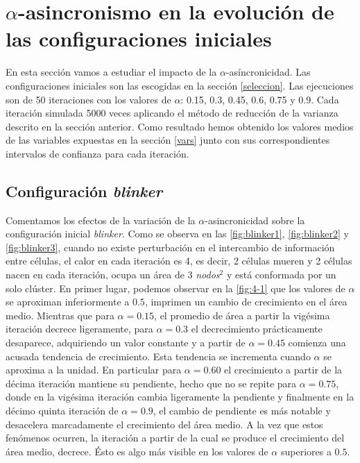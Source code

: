 \documentclass[../proyecto.tex]{memoir}
\begin{document}
\section{$\alpha$-asincronismo en la evolución de las configuraciones iniciales}

En esta sección vamos a estudiar el impacto de la $\alpha$-asíncronicidad. Las configuraciones iniciales son las escogidas en la sección \ref{seleccion}. Las ejecuciones son de 50 iteraciones con los valores de $\alpha$: 0.15, 0.3, 0.45, 0.6, 0.75 y 0.9. Cada iteración simulada 5000 veces aplicando el método de reducción de la varianza descrito en la sección anterior. Como resultado hemos obtenido los valores medios de las variables expuestas en la sección \ref{vars} junto con sus correspondientes intervalos de confianza para cada iteración.

\subsection{Configuración \textit{blinker}}

Comentamos los efectos de la variación de la $\alpha$-asincronicidad sobre la configuración inicial \textit{blinker}. Como se observa en las \autoref{fig:blinker1}, \autoref{fig:blinker2} y \autoref{fig:blinker3}, cuando no existe perturbación en el intercambio de información entre células, el calor en cada iteración es 4, es decir, 2 células mueren y 2 células nacen en cada iteración, ocupa un área de 3 \textit{nodos}$^2$ y está conformada por un solo clúster. En primer lugar, podemos observar en la \autoref{fig:4-1} que los valores de $\alpha$ se aproximan inferiormente a $0.5$, imprimen un cambio de crecimiento en el área medio. Mientras que para $\alpha=0.15$, el promedio de área a partir la vigésima iteración decrece ligeramente, para $\alpha=0.3$ el decrecimiento prácticamente desaparece, adquiriendo un valor constante y a partir de $\alpha=0.45$ comienza una acusada tendencia de crecimiento. Esta tendencia se incrementa cuando $\alpha$ se aproxima a la unidad. En particular para $\alpha=0.60$ el crecimiento a partir de la décima iteración mantiene su pendiente, hecho que no se repite para $\alpha=0.75$, donde en la vigésima iteración cambia ligeramente la pendiente y finalmente en la décimo quinta iteración de $\alpha=0.9$, el cambio de pendiente es más notable y desacelera marcadamente el crecimiento del área medio. A la vez que estos fenómenos ocurren, la iteración a partir de la cual se produce el crecimiento del área medio, decrece. Ésto es algo más visible en los valores de $\alpha$ superiores a $0.5$.
\end{document}
